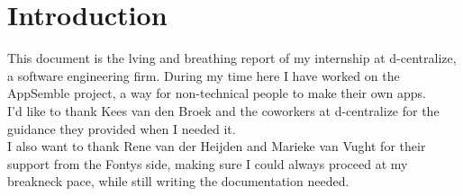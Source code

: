 \chapter{Introduction}
This document is the lving and breathing report of my internship at d-centralize, a software engineering firm. During my time here I have worked on the AppSemble project, a way for non-technical people to make their own apps. \\

I'd like to thank Kees van den Broek and the coworkers at d-centralize for the guidance they provided when I needed it. \\

I also want to thank Rene van der Heijden and Marieke van Vught for their support from the Fontys side, making sure I could always proceed at my breakneck pace, while still writing the documentation needed.